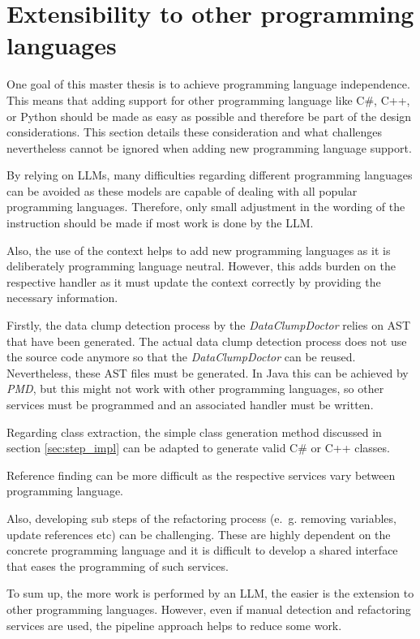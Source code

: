 \section{Extensibility to  other programming languages}\label{sec:lang_indep}

One goal of this master thesis is to achieve programming language independence. This means that adding support for other programming language like  C\#, C++, or Python should be made as easy as possible and therefore be part of the design considerations. This section details these consideration and what challenges nevertheless cannot be ignored when adding new programming language support.

By relying on \acp{LLM}, many difficulties regarding different programming languages can be avoided as these models are capable of dealing with all popular programming languages. Therefore, only small adjustment in the wording of the instruction should be made if most work is done by the \ac{LLM}.

Also, the use of the context helps to add new programming languages as it is deliberately programming language neutral. However, this adds burden on the respective handler as it must update the context correctly by providing the necessary information. 

Firstly, the data clump detection process by the \textit{DataClumpDoctor} relies on \ac{AST} that have been generated. The actual data clump detection process does not use the source code anymore so that the \textit{DataClumpDoctor} can be reused. Nevertheless, these \ac{AST} files must be generated. In Java this can be achieved by \textit{PMD}, but this might not work with other programming languages, so other services must be programmed and an associated handler must be written.

Regarding class extraction, the simple class generation method discussed in section \ref{sec:step_impl} can be adapted to generate valid C\# or C++ classes.

Reference finding can be more difficult as the respective services vary between programming language.

Also, developing sub steps  of the refactoring process (e.~g. removing variables, update references etc) can be challenging. These are highly dependent on the concrete programming language and it is difficult to develop a shared interface that eases the programming of such services.

To sum up, the more work is performed by an \ac{LLM}, the easier is the extension to other programming languages. However, even if manual detection and refactoring services are used, the pipeline approach helps to reduce some work.  

